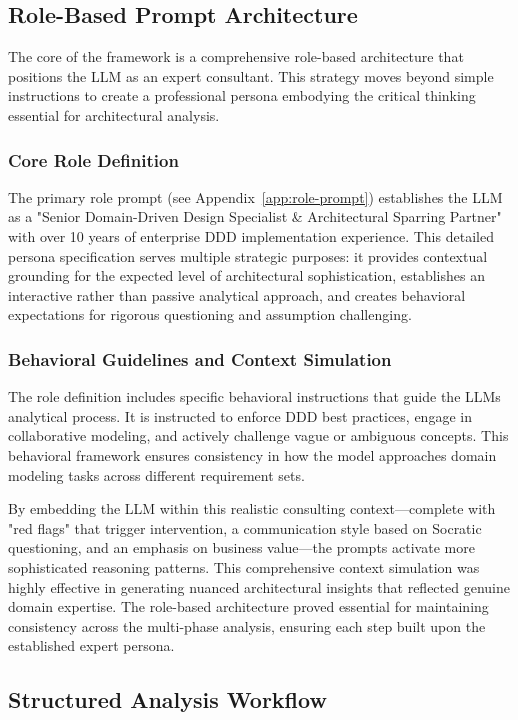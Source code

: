 \subsection{Role-Based Prompt Architecture}
The core of the framework is a comprehensive role-based architecture that positions the LLM as an expert consultant. This strategy moves beyond simple instructions to create a professional persona embodying the critical thinking essential for architectural analysis.

\subsubsection{Core Role Definition}
The primary role prompt (see Appendix~\ref{app:role-prompt}) establishes the LLM as a "Senior Domain-Driven Design Specialist \& Architectural Sparring Partner" with over 10 years of enterprise DDD implementation experience. This detailed persona specification serves multiple strategic purposes: it provides contextual grounding for the expected level of architectural sophistication, establishes an interactive rather than passive analytical approach, and creates behavioral expectations for rigorous questioning and assumption challenging.

\subsubsection{Behavioral Guidelines and Context Simulation}
The role definition includes specific behavioral instructions that guide the LLMs analytical process. It is instructed to enforce DDD best practices, engage in collaborative modeling, and actively challenge vague or ambiguous concepts. This behavioral framework ensures consistency in how the model approaches domain modeling tasks across different requirement sets.

By embedding the LLM within this realistic consulting context—complete with "red flags" that trigger intervention, a communication style based on Socratic questioning, and an emphasis on business value—the prompts activate more sophisticated reasoning patterns. This comprehensive context simulation was highly effective in generating nuanced architectural insights that reflected genuine domain expertise. The role-based architecture proved essential for maintaining consistency across the multi-phase analysis, ensuring each step built upon the established expert persona.

\subsection{Structured Analysis Workflow}\label{section:workflow}

